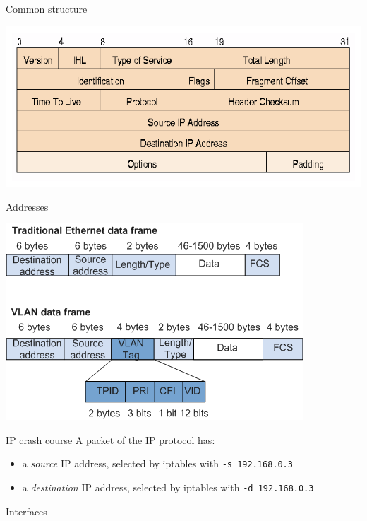 \begin{reveals}
\begin{frame}[c]{Common structure}
  \begin{center}
    \includegraphics[height=0.5\textheight]{images/ipcomplete.png}
  \end{center}
\end{frame}


\begin{frame}[c]{Addresses}
  
  \begin{center}
    \includegraphics[height=0.5\textheight]{images/ipframe.png}
  \end{center}

  \begin{block}{IP crash course}
    A packet of the IP protocol has:
    \begin{itemize}
    \item a \emph{source} IP address, selected by iptables with
      \texttt{-s 192.168.0.3}
    \item a \emph{destination} IP address, selected by iptables with
      \texttt{-d 192.168.0.3}
    \end{itemize}
  \end{block}
\end{frame}


\begin{frame}[c]{Interfaces}
  

\end{frame}
\end{reveals}
